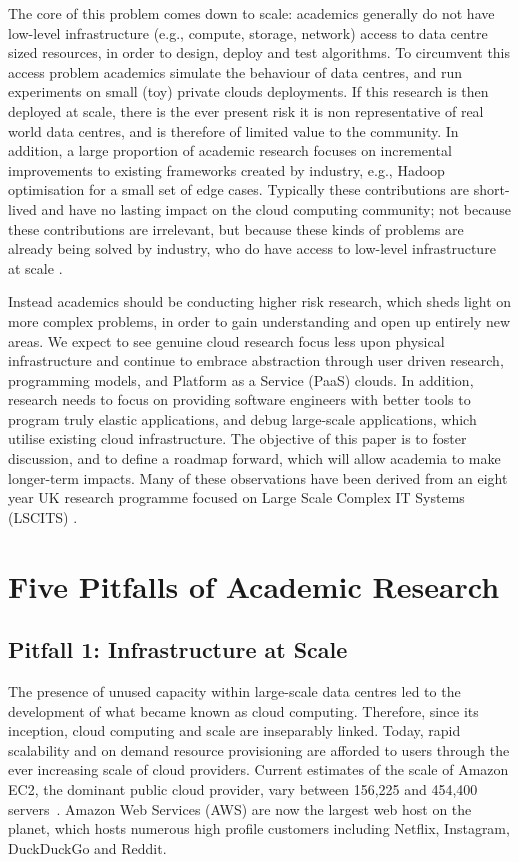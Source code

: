 \documentclass[letterpaper,twocolumn,10pt]{article}
\begin{document}
The core of this problem comes down to scale: academics generally do not have low-level infrastructure (e.g., compute, storage, network) access to data centre sized resources, in order to design, deploy and test algorithms. To circumvent this access problem academics simulate the behaviour of data centres, and run experiments on small (toy) private clouds deployments. If this research is then deployed at scale, there is the ever present risk it is non representative of real world data centres, and is therefore of limited value to the community. In addition, a large proportion of academic research focuses on incremental improvements to existing frameworks created by industry, e.g., Hadoop optimisation for a small set of edge cases. Typically these contributions are short-lived and have no lasting impact on the cloud computing community; not because these contributions are irrelevant, but  because these kinds of problems are already being solved by industry, who do have access to low-level infrastructure at scale \cite{welsh}. 

Instead academics should be conducting higher risk research, which sheds light on more complex problems, in order to gain understanding and open up entirely new areas. We expect to see genuine cloud research focus less upon physical infrastructure and continue to embrace abstraction through user driven research, programming models, and Platform as a Service (PaaS) clouds. In addition, research needs to focus on providing software engineers with better tools to program truly elastic applications, and debug large-scale applications, which utilise existing cloud infrastructure. The objective of this paper is to foster discussion, and to define a roadmap forward, which will allow academia to make longer-term impacts. Many of these observations have been derived from an eight year UK research programme focused on Large Scale Complex IT Systems (LSCITS) \cite{LSCITS}.  

\section{Five Pitfalls of Academic  Research}

\subsection*{Pitfall 1: Infrastructure at Scale}

The presence of unused capacity within large-scale data centres led to the development of what became known as cloud computing. Therefore, since its inception, cloud computing and scale are inseparably linked. Today, rapid scalability and on demand resource provisioning are afforded to users through the ever increasing scale of cloud providers. Current estimates of the scale of Amazon EC2, the dominant public cloud provider, vary between 156,225 and 454,400 servers~\cite{netcraft}. Amazon Web Services (AWS) are now the largest web host on the planet, which hosts numerous high profile customers including Netflix, Instagram, DuckDuckGo and Reddit. 
\end{document}
